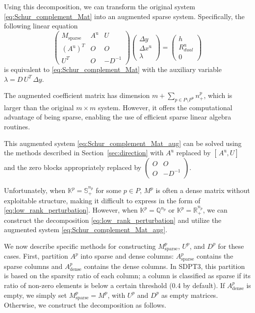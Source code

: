 Using this decomposition, we can transform the original system \eqref{eq:Schur_complement_Mat} 
into an augmented sparse system. Specifically, the following linear equation
\begin{equation}
  \begin{pmatrix}
    M_{\mathrm{sparse}} & A^{\text{u}} & U \\
    (A^{\text{u}})^T & O & O \\
    U^T & O & -D^{-1}
  \end{pmatrix}
  \begin{pmatrix}
    \Delta y \\
    \Delta x^{\text{u}} \\
    \lambda
  \end{pmatrix}
  =
  \begin{pmatrix}
    h \\
    R^{\text{u}}_{dual} \\
    0
  \end{pmatrix}
  \label{eq:Schur_complement_Mat_aug}
\end{equation}
is equivalent to \eqref{eq:Schur_complement_Mat} with the auxiliary variable $\lambda = D\,U^T\,\Delta y$.

The augmented coefficient matrix has dimension $m+\sum_{p\in P\setminus P^{\text{u}}} n^p_+$, 
which is larger than the original $m \times m$ system. 
However, it offers the computational advantage of being sparse, 
enabling the use of efficient sparse linear algebra routines.

This augmented system \eqref{eq:Schur_complement_Mat_aug} can be solved using the methods 
described in Section~\ref{sec:direction} with 
$A^{\text{u}}$ replaced by $[\,A^{\text{u}}, U]$ and the zero blocks appropriately replaced by 
$\begin{pmatrix} O & O \\ O & -D^{-1} \end{pmatrix}$.

Unfortunately, when $\mathbb{K}^p = \mathbb{S}^{n_p}_+$ for some $p \in P$, 
$M^p$ is often a dense matrix without exploitable structure, 
making it difficult to express in the form of \eqref{eq:low_rank_perturbation}.
However, when $\mathbb{K}^p = \mathbb{Q}^{n_p}$ or $\mathbb{K}^p = \mathbb{R}^{n_p}_+$, 
we can construct the decomposition \eqref{eq:low_rank_perturbation} 
and utilize the augmented system \eqref{eq:Schur_complement_Mat_aug}.

We now describe specific methods for constructing $M^p_{\mathrm{sparse}}$, $U^p$, and $D^p$ 
for these cases.
First, partition $A^p$ into sparse and dense columns:
$A^p_{\mathrm{sparse}}$ contains the sparse columns and 
$A^p_{\mathrm{dense}}$ contains the dense columns.
In SDPT3, this partition is based on the sparsity ratio of each column;
a column is classified as sparse if its ratio of non-zero elements 
is below a certain threshold (0.4 by default).
If $A^p_{\mathrm{dense}}$ is empty, we simply set $M^p_{\mathrm{sparse}} = M^p$, 
with $U^p$ and $D^p$ as empty matrices.
Otherwise, we construct the decomposition as follows.


